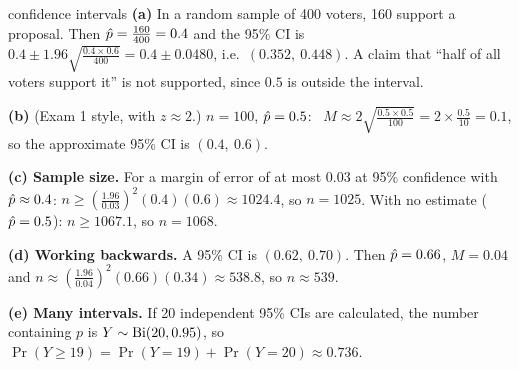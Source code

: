 \begin{example}{confidence intervals}
\textbf{(a) \examtwo} In a random sample of 400 voters, 160 support a proposal. Then $\hat{p}=\frac{160}{400}=0.4$ and the 95\% CI is $0.4\pm1.96\sqrt{\frac{0.4\times0.6}{400}}=0.4\pm0.0480$, i.e.\ $(0.352,\ 0.448)$. A claim that ``half of all voters support it'' is not supported, since $0.5$ is outside the interval.\par
\textbf{(b) \byhand} (Exam 1 style, with $z\approx2$.) $n=100$, $\hat{p}=0.5$: \ $M\approx2\sqrt{\frac{0.5\times0.5}{100}}=2\times\frac{0.5}{10}=0.1$, so the approximate 95\% CI is $(0.4,\ 0.6)$.\par
\textbf{(c) Sample size.} For a margin of error of at most $0.03$ at 95\% confidence with $\hat{p}\approx0.4$: $n\ge\left(\frac{1.96}{0.03}\right)^2(0.4)(0.6)\approx1024.4$, so $n=1025$. With no estimate ($\hat{p}=0.5$): $n\ge1067.1$, so $n=1068$.\par
\textbf{(d) Working backwards.} A 95\% CI is $(0.62,\ 0.70)$. Then $\hat{p}=0.66$, $M=0.04$ and $n\approx\left(\frac{1.96}{0.04}\right)^2(0.66)(0.34)\approx538.8$, so $n\approx539$.\par
\textbf{(e) Many intervals.} If 20 independent 95\% CIs are calculated, the number containing $p$ is $Y\sim\mathrm{Bi}(20,0.95)$, so $\Pr(Y\ge19)=\Pr(Y=19)+\Pr(Y=20)\approx0.736$.
\end{example}
